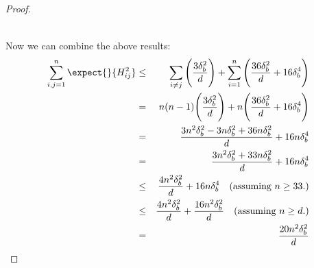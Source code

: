 \begin{proof}
\begin{enumerate}
\begin{eqnarray*}
\end{eqnarray*}
\end{enumerate}
Now we can combine the above results:
\begin{eqnarray*}
	\sum_{i,j=1}^n \expect{}{H_{ij}^2} &\leq& \sum_{i \neq j} \Bigg(\frac{3\delta_b^2}{d} \Bigg) 
	+ \sum_{i=1}^n \Bigg(\frac{36\delta_b^2}{d} + 16 \delta_b^4\Bigg) \\
	&=& n(n-1)\Bigg(\frac{3\delta_b^2}{d} \Bigg) 
	+ n\Bigg(\frac{36\delta_b^2}{d} + 16 \delta_b^4\Bigg) \\
	&=& \frac{3n^2\delta_b^2 - 3n \delta_b^2 + 36 n \delta_b^2}{d} + 16n \delta_b^4 \\
	&=& \frac{3n^2\delta_b^2 + 33 n \delta_b^2}{d} + 16n \delta_b^4 \\
	&\leq& \frac{4n^2\delta_b^2}{d} + 16n \delta_b^4  \quad \text{(assuming $n\geq 33$.)}\\
	&\leq& \frac{4n^2\delta_b^2}{d} + \frac{16n^2\delta_b^2}{d}  \quad \text{(assuming $n\geq d$.)}\\
	&=& \frac{20n^2\delta_b^2}{d}\\
\end{eqnarray*}
\end{proof}



%

